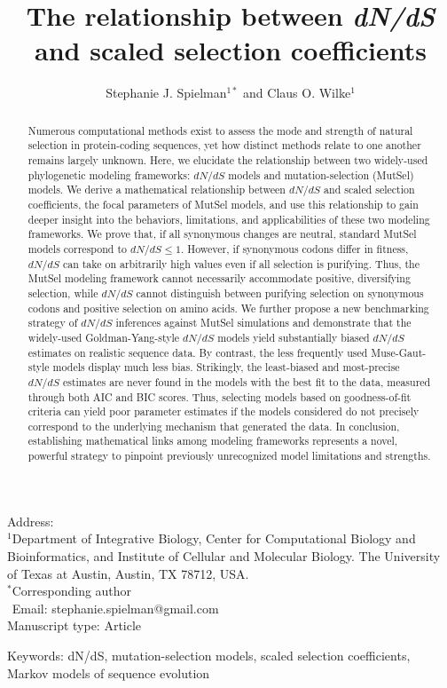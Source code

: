\documentclass[11pt]{article}
\begin{document}
	
\title{\textbf{The relationship between \emph{dN/dS} and scaled selection coefficients}}
\author{Stephanie J. Spielman$^{1*}$ and Claus O. Wilke$^{1}$}
\date{}

\maketitle
\noindent
Address:\\
$^1$Department of Integrative Biology, Center for Computational Biology and Bioinformatics, and Institute of Cellular and Molecular Biology.
The University of Texas at Austin, Austin, TX 78712, USA.\\

\bigskip
\noindent
$^*$Corresponding author\\
$\phantom{^*}$Email: stephanie.spielman@gmail.com\\
	
\bigskip
\noindent
Manuscript type: Article

\bigskip
\noindent Keywords: dN/dS, mutation-selection models, scaled selection coefficients, Markov models of sequence evolution

	
\newpage
\begin{abstract}
Numerous computational methods exist to assess the mode and strength of natural selection in protein-coding sequences, yet how distinct methods relate to one another remains largely unknown. Here, we elucidate the relationship between two widely-used phylogenetic modeling frameworks: $dN/dS$ models and mutation-selection (MutSel) models. We derive a mathematical relationship between $dN/dS$ and scaled selection coefficients, the focal parameters of MutSel models, and use this relationship to gain deeper insight into the behaviors, limitations, and applicabilities of these two modeling frameworks. We prove that, if all synonymous changes are neutral, standard MutSel models correspond to $dN/dS \leq 1$. However, if synonymous codons differ in fitness, $dN/dS$ can take on arbitrarily high values even if all selection is purifying. Thus, the MutSel modeling framework cannot necessarily accommodate positive, diversifying selection, while $dN/dS$ cannot distinguish between purifying selection on synonymous codons and positive selection on amino acids. We further propose a new benchmarking strategy of $dN/dS$ inferences against MutSel simulations and demonstrate that the widely-used Goldman-Yang-style $dN/dS$ models yield substantially biased $dN/dS$ estimates on realistic sequence data. By contrast, the less frequently used Muse-Gaut-style models display much less bias. Strikingly, the least-biased and most-precise $dN/dS$ estimates are never found in the models with the best fit to the data, measured through both AIC and BIC scores. Thus, selecting models based on goodness-of-fit criteria can yield poor parameter estimates if the models considered do not precisely correspond to the underlying mechanism that generated the data. In conclusion, establishing mathematical links among modeling frameworks represents a novel, powerful strategy to pinpoint previously unrecognized model limitations and strengths.
\end{abstract}
\end{document}
